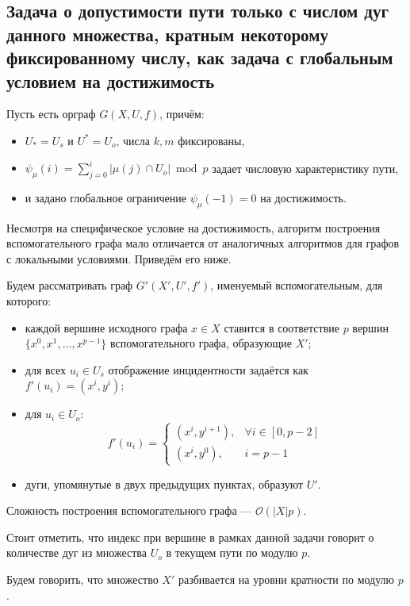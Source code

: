 \subsection{Задача о допустимости пути только с числом дуг данного множества, кратным некоторому фиксированному числу, как задача с глобальным условием на достижимость}

Пусть есть орграф $G(X,U,f)$, причём:
\begin{itemize}
	\item $U_* = U_s$ и $U^* = U_o$, числа $k, m$ фиксированы,
	\item $\psi_\mu(i) = \sum_{j=0}^i | \mu(j) \cap U_o | \bmod p$ задает числовую характеристику пути, 
	\item и задано глобальное ограничение $\psi_\mu(-1) = 0$ на достижимость.
\end{itemize}

Несмотря на специфическое условие на достижимость, алгоритм построения вспомогательного графа мало отличается от аналогичных алгоритмов для графов с локальными условиями. Приведём его ниже.

Будем рассматривать граф $G'(X',U',f')$, именуемый вспомогательным, для которого: 
\begin{itemize}
	\item каждой вершине исходного графа $x \in X$ ставится в соответствие $p$ вершин $\{x^0, x^1, ... , x^{p-1} \}$ вспомогательного графа, образующие $X'$;
	\item для всех $u_i \in U_s$ отображение инцидентности задаётся как $f'(u_i) = (x^i, y^i)$;
	\item для $u_i \in U_o$:
	\begin{equation*}
	f'(u_i) = 
	\begin{cases}
	(x^i, y^{i+1}), &\text{$\forall i \in [0, p-2]$}\\
	(x^i, y^0), &\text{$i = p-1$}
	\end{cases}
	\end{equation*}
	\item дуги, упомянутые в двух предыдущих пунктах, образуют $U'$.
\end{itemize}

Сложность построения вспомогательного графа --- $\mathcal{O}(|X|p)$.

Стоит отметить, что индекс при вершине в рамках данной задачи говорит о количестве дуг из множества $U_o$ в текущем пути по модулю $p$. 

\begin{definition}
	Будем говорить, что множество $X'$ разбивается на уровни кратности по модулю $p$.
\end{definition}

